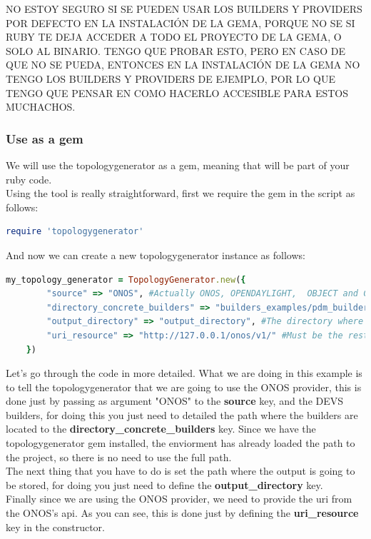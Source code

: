 NO ESTOY SEGURO SI SE PUEDEN USAR LOS BUILDERS Y PROVIDERS POR DEFECTO EN LA INSTALACIÓN DE LA GEMA, PORQUE NO SE SI RUBY TE DEJA ACCEDER A TODO EL PROYECTO DE LA GEMA, O SOLO AL BINARIO. TENGO QUE PROBAR ESTO, PERO EN CASO DE QUE NO SE PUEDA, ENTONCES EN LA INSTALACIÓN DE LA GEMA NO TENGO LOS BUILDERS Y PROVIDERS DE EJEMPLO, POR LO QUE TENGO QUE PENSAR EN COMO HACERLO ACCESIBLE PARA ESTOS MUCHACHOS.

\subsubsection{Use as a gem}

We will use the topologygenerator as a gem, meaning that will be part of your ruby code. \\
Using the tool is really straightforward, first we require the gem in the script as follows:

\begin{lstlisting}[language=Ruby,breaklines=true]
require 'topologygenerator'
\end{lstlisting}

And now we can create a new topologygenerator instance as follows:

\begin{lstlisting}[language=Ruby,breaklines=true]
my_topology_generator = TopologyGenerator.new({
        "source" => "ONOS", #Actually ONOS, OPENDAYLIGHT,  OBJECT and CUSTOM are the options supported
        "directory_concrete_builders" => "builders_examples/pdm_builders", #The directory where builders are located
        "output_directory" => "output_directory", #The directory where the output will be saved
        "uri_resource" => "http://127.0.0.1/onos/v1/" #Must be the rest api uri if either ONOS or OpenDayLight is choosed or the path of a file if CUSTOM is choosed. In case OBJECT is choosed, you will have to provide a valid instance of Topology.
    })
\end{lstlisting}

Let's go through the code in more detailed. What we are doing in this example is to tell the topologygenerator that we are going to use the ONOS provider, this is done just by passing as argument "ONOS" to the \textbf{source} key, and the DEVS builders, for doing this you just need to detailed the path where the builders are located to the \textbf{directory\_concrete\_builders} key. Since we have the topologygenerator gem installed, the enviorment has already loaded the path to the project, so there is no need to use the full path.\\
The next thing that you have to do is set the path where the output is going to be stored, for doing you just need to define the \textbf{output\_directory} key.\\
Finally since we are using the ONOS provider, we need to provide the uri from the ONOS's api. As you can see, this is done just by defining the \textbf{uri\_resource} key in the constructor. \\

